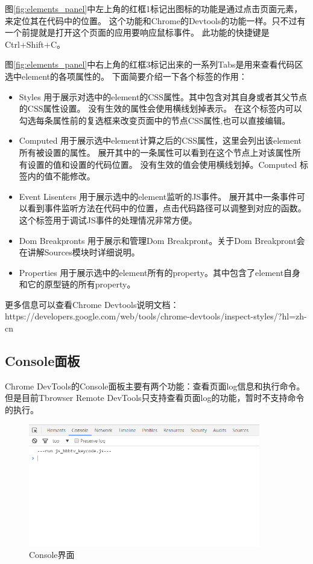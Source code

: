 图\ref{fig:elements_panel}中左上角的红框1标记出图标的功能是通过点击页面元素，来定位其在代码中的位置。
这个功能和Chrome的Devtools的功能一样。只不过有一个前提就是打开这个页面的应用要响应鼠标事件。
此功能的快捷键是Ctrl+Shift+C。

图\ref{fig:elements_panel}中右上角的红框3标记出来的一系列Tabs是用来查看代码区选中element的各项属性的。
下面简要介绍一下各个标签的作用：
\begin{itemize}
\item Styles 用于展示对选中的element的CSS属性。其中包含对其自身或者其父节点的CSS属性设置。
没有生效的属性会使用横线划掉表示。
在这个标签内可以勾选每条属性前的复选框来改变页面中的节点CSS属性,也可以直接编辑。
\item Computed 用于展示选中element计算之后的CSS属性，这里会列出该element所有被设置的属性。
展开其中的一条属性可以看到在这个节点上对该属性所有设置的值和设置的代码位置。
没有生效的值会使用横线划掉。Computed 标签内的值不能修改。
\item Event Lisenters 用于展示选中的element监听的JS事件。
展开其中一条事件可以看到事件监听方法在代码中的位置，点击代码路径可以调整到对应的函数。
这个标签用于调试JS事件的处理情况非常方便。
\item Dom Breakpronts 用于展示和管理Dom Breakpront。关于Dom Breakpront会在讲解Sources模块时详细说明。
\item Properties 用于展示选中的element所有的property。其中包含了element自身和它的原型链的所有property。
\end{itemize}

更多信息可以查看Chrome Devtools说明文档：https://developers.google.com/web/tools/chrome-devtools/inspect-styles/?hl=zh-cn

\subsection{Console面板}
Chrome DevTools的Console面板主要有两个功能：查看页面log信息和执行命令。
但是目前Tbrowser Remote DevTools只支持查看页面log的功能，暂时不支持命令的执行。

\begin{figure}[H] 
\centering 
\includegraphics[width=0.9\textwidth]{image/devtools_study/console_panel.png} 
\caption{Console界面} \label{fig:consloe_panel} 
\end{figure}

